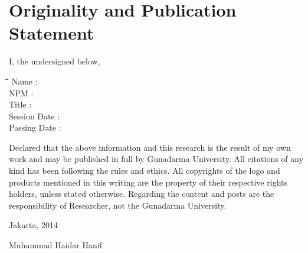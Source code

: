 \begingroup
\let\clearpage\relax
\let\cleardoublepage\relax

\chapter{Originality and Publication Statement}
\label{chap:sig-statement}

I, the undersigned below,

\begin{tabbing}
\hspace*{3cm}\=\hspace*{0.5cm}\= \kill
Name \>:\> \myName \\
NPM \>:\> \myNPM \\
Title \>:\> \myDepTitle \\
Session Date \>:\> \myDateSession \\
Passing Date \>:\> \myDatePassing
\end{tabbing}

Declared that the above information and this research is the result of my own work and may be published in full by Gunadarma University. All citations of any kind has been following the rules and ethics. All copyrights of the logo and products mentioned in this writing are the property of their respective rights holders, unless stated otherwise. Regarding the content and posts are the responsibility of Researcher, not the Gunadarma University.

\hfill

\noindent Jakarta, 2014

\hfill

\noindent Muhammad Haidar Hanif

\endgroup

